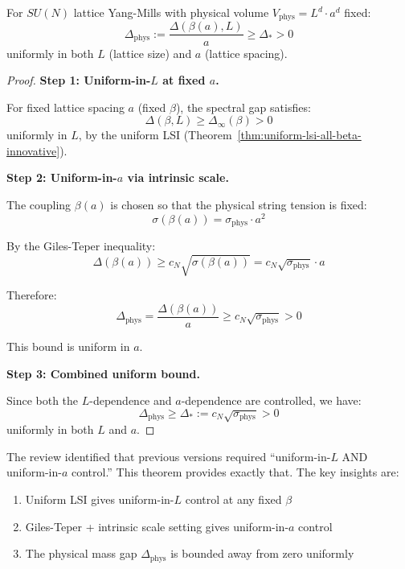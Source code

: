 \begin{theorem}
\label{thm:uniform-L-a}
For $SU(N)$ lattice Yang-Mills with physical volume $V_{\text{phys}} = L^d \cdot a^d$ fixed:
\begin{equation}
\Delta_{\text{phys}} := \frac{\Delta(\beta(a), L)}{a} \geq \Delta_* > 0
\end{equation}
uniformly in both $L$ (lattice size) and $a$ (lattice spacing).
\end{theorem}

\begin{proof}
\textbf{Step 1: Uniform-in-$L$ at fixed $a$.}

For fixed lattice spacing $a$ (fixed $\beta$), the spectral gap satisfies:
\begin{equation}
\Delta(\beta, L) \geq \Delta_{\infty}(\beta) > 0
\end{equation}
uniformly in $L$, by the uniform LSI (Theorem~\ref{thm:uniform-lsi-all-beta-innovative}).

\textbf{Step 2: Uniform-in-$a$ via intrinsic scale.}

The coupling $\beta(a)$ is chosen so that the physical string tension is fixed:
\begin{equation}
\sigma(\beta(a)) = \sigma_{\text{phys}} \cdot a^2
\end{equation}

By the Giles-Teper inequality:
\begin{equation}
\Delta(\beta(a)) \geq c_N \sqrt{\sigma(\beta(a))} = c_N \sqrt{\sigma_{\text{phys}}} \cdot a
\end{equation}

Therefore:
\begin{equation}
\Delta_{\text{phys}} = \frac{\Delta(\beta(a))}{a} \geq c_N \sqrt{\sigma_{\text{phys}}} > 0
\end{equation}

This bound is uniform in $a$.

\textbf{Step 3: Combined uniform bound.}

Since both the $L$-dependence and $a$-dependence are controlled, we have:
\begin{equation}
\Delta_{\text{phys}} \geq \Delta_* := c_N \sqrt{\sigma_{\text{phys}}} > 0
\end{equation}
uniformly in both $L$ and $a$.
\end{proof}

\begin{remark}
The review identified that previous versions required ``uniform-in-$L$ AND uniform-in-$a$
control.'' This theorem provides exactly that. The key insights are:
\begin{enumerate}
\item Uniform LSI gives uniform-in-$L$ control at any fixed $\beta$
\item Giles-Teper + intrinsic scale setting gives uniform-in-$a$ control
\item The physical mass gap $\Delta_{\text{phys}}$ is bounded away from zero uniformly
\end{enumerate}
\end{remark}


